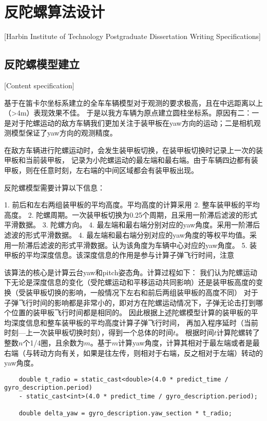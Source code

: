 

\chapter[反陀螺算法设计]{反陀螺算法设计}[Harbin Institute of Technology Postgraduate Dissertation Writing Specifications]

\section{反陀螺模型建立}[Content specification]

基于在笛卡尔坐标系建立的全车车辆模型对于观测的要求极高，且在中远距离以上（>4m）表现效果不佳。
于是以我方车辆为原点建立圆柱坐标系。原因有二：一是对于陀螺运动的敌方车辆我们更加关注于装甲板在yaw方向的运动；二是相机观测模型保证了yaw方向的观测精度。


在敌方车辆进行陀螺运动时，会发生装甲板切换，在装甲板切换时记录上一次的装甲板和当前装甲板，
记录为小陀螺运动的最左端和最右端。由于车辆四边都有装甲板，则在任意时刻，左右端的中间区域都会有装甲板出现。

反陀螺模型需要计算以下信息：

1. 前后和左右两组装甲板的平均高度。平均高度的计算采用
2. 整车装甲板的平均高度。
2. 陀螺周期。一次装甲板切换为0.25个周期，且采用一阶滞后滤波的形式平滑数据。
3. 陀螺方向。
4. 最左端和最右端分别对应的yaw角度。采用一阶滞后滤波的形式平滑数据。
4. 最左端和最右端分别对应的yaw角度的等权平均值。采用一阶滞后滤波的形式平滑数据。认为该角度为车辆中心对应的yaw角度。
5. 装甲板的平均深度信息。该深度信息的作用是参与计算子弹飞行时间，注意

该算法的核心是计算云台yaw和pitch姿态角。计算过程如下：
我们认为陀螺运动下无论是深度信息的变化（受陀螺运动和平移运动共同影响）还是装甲板高度的变换（受装甲板切换的影响，一般情况下左右和前后两组装甲板的高度不同）
对于子弹飞行时间的影响都是非常小的，即对方在陀螺运动情况下，子弹无论击打到哪个位置的装甲板飞行时间都是相同的。
因此根据上述陀螺模型计算的装甲板的平均深度信息和整车装甲板的平均高度计算子弹飞行时间，
再加入程序延时（当前时刻—上一次装甲板切换时刻），得到一个总体的时间$t$。
根据时间$t$计算陀螺转了整数$n$个1/4圈，且余数为$m$。基于$m$计算yaw角度，计算其相对于最左端或者是最右端（与转动方向有关，如果是往左传，则相对于右端，反之相对于左端）转动的yaw角度。

\begin{lstlisting}
    double t_radio = static_cast<double>(4.0 * predict_time / gyro_description.period) 
    - static_cast<int>(4.0 * predict_time / gyro_description.period);

    double delta_yaw = gyro_description.yaw_section * t_radio;
\end{lstlisting}

